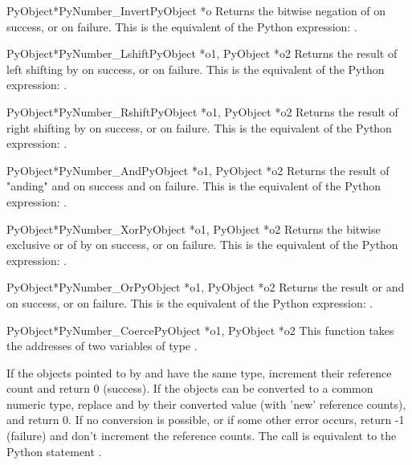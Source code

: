      \begin{cfuncdesc}{PyObject*}{PyNumber_Invert}{PyObject *o}
	 Returns the bitwise negation of  on success, or {\NULL} on
	 failure.  This is the equivalent of the Python expression:
	 .
     \end{cfuncdesc}


     \begin{cfuncdesc}{PyObject*}{PyNumber_Lshift}{PyObject *o1, PyObject *o2}
	 Returns the result of left shifting  by  on success, or
	 {\NULL} on failure.  This is the equivalent of the Python
	 expression: .
     \end{cfuncdesc}


     \begin{cfuncdesc}{PyObject*}{PyNumber_Rshift}{PyObject *o1, PyObject *o2}
	 Returns the result of right shifting  by  on success, or
	 {\NULL} on failure.  This is the equivalent of the Python
	 expression: .
     \end{cfuncdesc}


     \begin{cfuncdesc}{PyObject*}{PyNumber_And}{PyObject *o1, PyObject *o2}
	 Returns the result of "anding"  and  on success and {\NULL}
	 on failure. This is the equivalent of the Python
	 expression: .
     \end{cfuncdesc}


     \begin{cfuncdesc}{PyObject*}{PyNumber_Xor}{PyObject *o1, PyObject *o2}
	 Returns the bitwise exclusive or of  by  on success, or
	 {\NULL} on failure.  This is the equivalent of the Python
	 expression: .
     \end{cfuncdesc}

     \begin{cfuncdesc}{PyObject*}{PyNumber_Or}{PyObject *o1, PyObject *o2}
	 Returns the result or  and  on success, or {\NULL} on
	 failure.  This is the equivalent of the Python expression: 
	 .
     \end{cfuncdesc}


     \begin{cfuncdesc}{PyObject*}{PyNumber_Coerce}{PyObject *o1, PyObject *o2}
	 This function takes the addresses of two variables of type
         .

         If the objects pointed to by  and  have the same type,
         increment their reference count and return 0 (success).
         If the objects can be converted to a common numeric type,
         replace  and  by their converted value (with 'new'
         reference counts), and return 0.
         If no conversion is possible, or if some other error occurs,
         return -1 (failure) and don't increment the reference counts.
         The call  is equivalent to the Python
         statement .
     \end{cfuncdesc}


